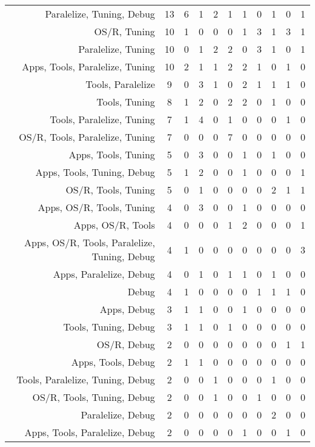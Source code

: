 {\begin{landscape}
\begin{longtable}[htb]{r|c|c|c|c|c|c|c|c|c|c}
{Paralelize, Tuning, Debug} & 13 & 6 & 1 & 2 & 1 & 1 & 0 & 1 & 0 & 1 \\%
{OS/R, Tuning} & 10 & 1 & 0 & 0 & 0 & 1 & 3 & 1 & 3 & 1 \\%
{Paralelize, Tuning} & 10 & 0 & 1 & 2 & 2 & 0 & 3 & 1 & 0 & 1 \\%
{Apps, Tools, Paralelize, Tuning} & 10 & 2 & 1 & 1 & 2 & 2 & 1 & 0 & 1 & 0 \\%
{Tools, Paralelize} & 9 & 0 & 3 & 1 & 0 & 2 & 1 & 1 & 1 & 0 \\%
{Tools, Tuning} & 8 & 1 & 2 & 0 & 2 & 2 & 0 & 1 & 0 & 0 \\%
{Tools, Paralelize, Tuning} & 7 & 1 & 4 & 0 & 1 & 0 & 0 & 0 & 1 & 0 \\%
{OS/R, Tools, Paralelize, Tuning} & 7 & 0 & 0 & 0 & 7 & 0 & 0 & 0 & 0 & 0 \\%
{Apps, Tools, Tuning} & 5 & 0 & 3 & 0 & 0 & 1 & 0 & 1 & 0 & 0 \\%
{Apps, Tools, Tuning, Debug} & 5 & 1 & 2 & 0 & 0 & 1 & 0 & 0 & 0 & 1 \\%
{OS/R, Tools, Tuning} & 5 & 0 & 1 & 0 & 0 & 0 & 0 & 2 & 1 & 1 \\%
{Apps, OS/R, Tools, Tuning} & 4 & 0 & 3 & 0 & 0 & 1 & 0 & 0 & 0 & 0 \\%
{Apps, OS/R, Tools} & 4 & 0 & 0 & 0 & 1 & 2 & 0 & 0 & 0 & 1 \\%
{Apps, OS/R, Tools, Paralelize, Tuning, Debug} & 4 & 1 & 0 & 0 & 0 & 0 & 0 & 0 & 0 & 3 \\%
{Apps, Paralelize, Debug} & 4 & 0 & 1 & 0 & 1 & 1 & 0 & 1 & 0 & 0 \\%
{Debug} & 4 & 1 & 0 & 0 & 0 & 0 & 1 & 1 & 1 & 0 \\%
{Apps, Debug} & 3 & 1 & 1 & 0 & 0 & 1 & 0 & 0 & 0 & 0 \\%
{Tools, Tuning, Debug} & 3 & 1 & 1 & 0 & 1 & 0 & 0 & 0 & 0 & 0 \\%
{OS/R, Debug} & 2 & 0 & 0 & 0 & 0 & 0 & 0 & 0 & 1 & 1 \\%
{Apps, Tools, Debug} & 2 & 1 & 1 & 0 & 0 & 0 & 0 & 0 & 0 & 0 \\%
{Tools, Paralelize, Tuning, Debug} & 2 & 0 & 0 & 1 & 0 & 0 & 0 & 1 & 0 & 0 \\%
{OS/R, Tools, Tuning, Debug} & 2 & 0 & 0 & 1 & 0 & 0 & 1 & 0 & 0 & 0 \\%
{Paralelize, Debug} & 2 & 0 & 0 & 0 & 0 & 0 & 0 & 2 & 0 & 0 \\%
{Apps, Tools, Paralelize, Debug} & 2 & 0 & 0 & 0 & 0 & 1 & 0 & 0 & 1 & 0 \\%

\end{longtable}
\end{landscape}}
